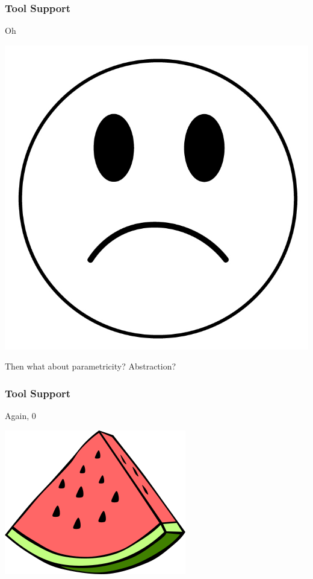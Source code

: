\begin{frame}
\frametitle{Tool Support}
\begin{center}
Oh
\end{center}
\vspace{2em}
\begin{center}
\includegraphics[width=0.3\paperwidth]{image/sad-face.jpg}
\end{center}
\vspace{1em}
\begin{center}
Then what about parametricity? Abstraction?
\end{center}
\end{frame}


\begin{frame}
\frametitle{Tool Support}
\begin{center}
\huge{Again, 0}\normalsize
\end{center}
\vspace{2em}
\begin{center}
\includegraphics[width=0.3\paperwidth]{image/watermelon.png}
\end{center}
\end{frame}


